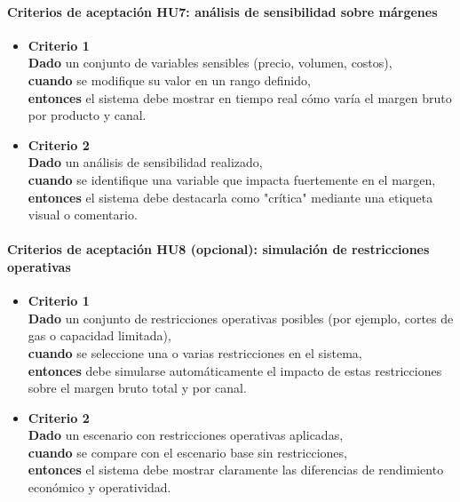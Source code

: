 \documentclass[
11pt, %
]{charter}
\begin{document}
\paragraph{Criterios de aceptación HU7: análisis de sensibilidad sobre márgenes}
\begin{itemize}
  \item \textbf{Criterio 1} \\
  \textbf{Dado} un conjunto de variables sensibles (precio, volumen, costos), \\
  \textbf{cuando} se modifique su valor en un rango definido, \\
  \textbf{entonces} el sistema debe mostrar en tiempo real cómo varía el margen bruto por producto y canal.

  \item \textbf{Criterio 2} \\
  \textbf{Dado} un análisis de sensibilidad realizado, \\
  \textbf{cuando} se identifique una variable que impacta fuertemente en el margen, \\
  \textbf{entonces} el sistema debe destacarla como "crítica" mediante una etiqueta visual o comentario.
\end{itemize}

\vspace{1em}

\paragraph{Criterios de aceptación HU8 (opcional): simulación de restricciones operativas}

\begin{itemize}
  \item \textbf{Criterio 1} \\
  \textbf{Dado} un conjunto de restricciones operativas posibles (por ejemplo, cortes de gas o capacidad limitada), \\
  \textbf{cuando} se seleccione una o varias restricciones en el sistema, \\
  \textbf{entonces} debe simularse automáticamente el impacto de estas restricciones sobre el margen bruto total y por canal.

  \item \textbf{Criterio 2} \\
  \textbf{Dado} un escenario con restricciones operativas aplicadas, \\
  \textbf{cuando} se compare con el escenario base sin restricciones, \\
  \textbf{entonces} el sistema debe mostrar claramente las diferencias de rendimiento económico y operatividad.
\end{itemize}
\end{document}
